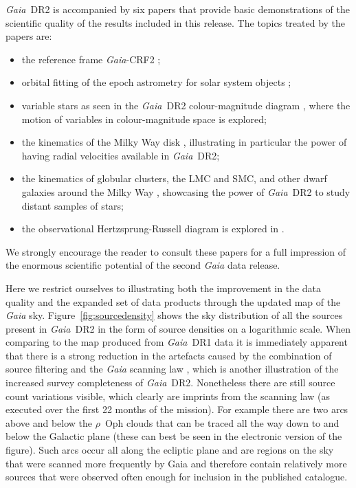 \documentclass[longauth]{aa_gaia} %
\newcommand\gaia{\textit{Gaia}}
\newcommand\gdr[1]{\gaia~DR#1}
\newcommand\gaiacrftwo{\gaia-CRF2}
\newcommand\figrefalt[1]{Figure~\ref{#1}}
\begin{document}
\gdr{2} is accompanied by six papers that provide basic demonstrations of the scientific quality
of the results included in this release. The topics treated by the papers are: 
%
\begin{itemize}
  \item the reference frame {\gaiacrftwo} \citep{DR2-DPACP-30}; 
  \item orbital fitting of the epoch astrometry for solar system objects \citep{DR2-DPACP-32};
  \item variable stars as seen in the \gdr{2} colour-magnitude diagram \citep{DR2-DPACP-35}, where
    the motion of variables in colour-magnitude space is explored;
  \item the kinematics of the Milky Way disk \citep{DR2-DPACP-33}, illustrating in particular the
    power of having radial velocities available in \gdr{2};
  \item the kinematics of globular clusters, the LMC and SMC, and other dwarf galaxies around the
    Milky Way \citep{DR2-DPACP-34}, showcasing the power of \gdr{2} to study distant samples of
    stars; 
  \item the observational Hertzsprung-Russell diagram is explored in
    \cite{DR2-DPACP-31}.
\end{itemize}
%
We strongly encourage the reader to consult these papers for a full impression of the enormous
scientific potential of the second {\gaia} data release.

Here we restrict ourselves to illustrating both the improvement in the data quality and the expanded
set of data products through the updated map of the {\gaia} sky.  \figrefalt{fig:sourcedensity}
shows the sky distribution of all the sources present in \gdr{2} in the form of source densities on
a logarithmic scale. When comparing to the map produced from \gdr{1} data
\citep{2016A&A...595A...2G} it is immediately apparent that there is a strong reduction in the
artefacts caused by the combination of source filtering and the {\gaia} scanning law \citep[see][for
a more detailed explanation of these artefacts]{2016A&A...595A...2G}, which is another illustration
of the increased survey completeness of \gdr{2}. Nonetheless there are still source count variations
visible, which clearly are imprints from the scanning law (as executed over the first 22 months of
the mission). For example there are two arcs above and below the $\rho$~Oph clouds that can be
traced all the way down to and below the Galactic plane (these can best be seen in the electronic
version of the figure). Such arcs occur all along the ecliptic plane and are regions on the sky that
were scanned more frequently by Gaia and therefore contain relatively more sources that were
observed often enough for inclusion in the published catalogue.
\end{document}
